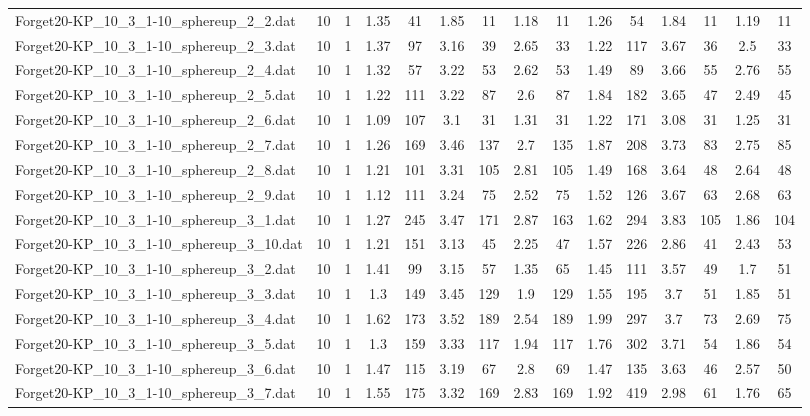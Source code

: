 \begin{table}[!ht]
{\begin{tabular}{lcccccccccccccc}
Forget20-KP\_10\_3\_1-10\_sphereup\_2\_2.dat & 10 & 1 & 1.35 & 41 & 1.85 & 11 & 1.18 & 11 & 1.26 & 54 & 1.84 & 11 & 1.19 & 11 \\
Forget20-KP\_10\_3\_1-10\_sphereup\_2\_3.dat & 10 & 1 & 1.37 & 97 & 3.16 & 39 & 2.65 & 33 & 1.22 & 117 & 3.67 & 36 & 2.5 & 33 \\
Forget20-KP\_10\_3\_1-10\_sphereup\_2\_4.dat & 10 & 1 & 1.32 & 57 & 3.22 & 53 & 2.62 & 53 & 1.49 & 89 & 3.66 & 55 & 2.76 & 55 \\
Forget20-KP\_10\_3\_1-10\_sphereup\_2\_5.dat & 10 & 1 & 1.22 & 111 & 3.22 & 87 & 2.6 & 87 & 1.84 & 182 & 3.65 & 47 & 2.49 & 45 \\
Forget20-KP\_10\_3\_1-10\_sphereup\_2\_6.dat & 10 & 1 & 1.09 & 107 & 3.1 & 31 & 1.31 & 31 & 1.22 & 171 & 3.08 & 31 & 1.25 & 31 \\
Forget20-KP\_10\_3\_1-10\_sphereup\_2\_7.dat & 10 & 1 & 1.26 & 169 & 3.46 & 137 & 2.7 & 135 & 1.87 & 208 & 3.73 & 83 & 2.75 & 85 \\
Forget20-KP\_10\_3\_1-10\_sphereup\_2\_8.dat & 10 & 1 & 1.21 & 101 & 3.31 & 105 & 2.81 & 105 & 1.49 & 168 & 3.64 & 48 & 2.64 & 48 \\
Forget20-KP\_10\_3\_1-10\_sphereup\_2\_9.dat & 10 & 1 & 1.12 & 111 & 3.24 & 75 & 2.52 & 75 & 1.52 & 126 & 3.67 & 63 & 2.68 & 63 \\
Forget20-KP\_10\_3\_1-10\_sphereup\_3\_1.dat & 10 & 1 & 1.27 & 245 & 3.47 & 171 & 2.87 & 163 & 1.62 & 294 & 3.83 & 105 & 1.86 & 104 \\
Forget20-KP\_10\_3\_1-10\_sphereup\_3\_10.dat & 10 & 1 & 1.21 & 151 & 3.13 & 45 & 2.25 & 47 & 1.57 & 226 & 2.86 & 41 & 2.43 & 53 \\
Forget20-KP\_10\_3\_1-10\_sphereup\_3\_2.dat & 10 & 1 & 1.41 & 99 & 3.15 & 57 & 1.35 & 65 & 1.45 & 111 & 3.57 & 49 & 1.7 & 51 \\
Forget20-KP\_10\_3\_1-10\_sphereup\_3\_3.dat & 10 & 1 & 1.3 & 149 & 3.45 & 129 & 1.9 & 129 & 1.55 & 195 & 3.7 & 51 & 1.85 & 51 \\
Forget20-KP\_10\_3\_1-10\_sphereup\_3\_4.dat & 10 & 1 & 1.62 & 173 & 3.52 & 189 & 2.54 & 189 & 1.99 & 297 & 3.7 & 73 & 2.69 & 75 \\
Forget20-KP\_10\_3\_1-10\_sphereup\_3\_5.dat & 10 & 1 & 1.3 & 159 & 3.33 & 117 & 1.94 & 117 & 1.76 & 302 & 3.71 & 54 & 1.86 & 54 \\
Forget20-KP\_10\_3\_1-10\_sphereup\_3\_6.dat & 10 & 1 & 1.47 & 115 & 3.19 & 67 & 2.8 & 69 & 1.47 & 135 & 3.63 & 46 & 2.57 & 50 \\
Forget20-KP\_10\_3\_1-10\_sphereup\_3\_7.dat & 10 & 1 & 1.55 & 175 & 3.32 & 169 & 2.83 & 169 & 1.92 & 419 & 2.98 & 61 & 1.76 & 65 \\

\end{tabular}}
\end{table}
